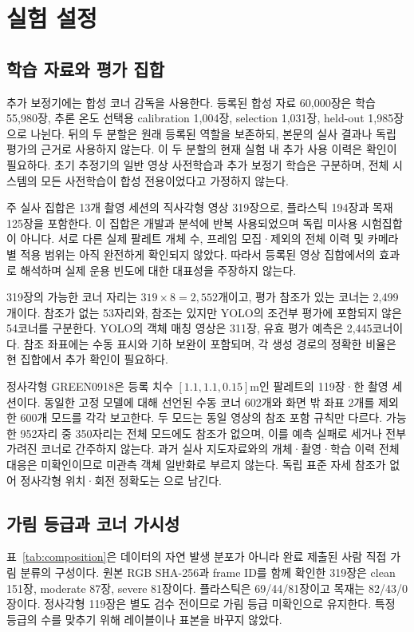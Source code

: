 \section{실험 설정}\label{sec:setup}
\subsection{학습 자료와 평가 집합}
추가 보정기에는 합성 코너 감독을 사용한다. 등록된 합성 자료 60,000장은 학습 55,980장, 추론 온도 선택용 calibration 1,004장, selection 1,031장, held-out 1,985장으로 나뉜다. 뒤의 두 분할은 원래 등록된 역할을 보존하되, 본문의 실사 결과나 독립 평가의 근거로 사용하지 않는다. 이 두 분할의 현재 실험 내 추가 사용 이력은 확인이 필요하다. 초기 추정기의 일반 영상 사전학습과 추가 보정기 학습은 구분하며, 전체 시스템의 모든 사전학습이 합성 전용이었다고 가정하지 않는다.

주 실사 집합은 13개 촬영 세션의 직사각형 영상 319장으로, 플라스틱 194장과 목재 125장을 포함한다. 이 집합은 개발과 분석에 반복 사용되었으며 독립 미사용 시험집합이 아니다. 서로 다른 실제 팔레트 개체 수, 프레임 모집·제외의 전체 이력 및 카메라별 적용 범위는 아직 완전하게 확인되지 않았다. 따라서 등록된 영상 집합에서의 효과로 해석하며 실제 운용 빈도에 대한 대표성을 주장하지 않는다.

319장의 가능한 코너 자리는 $319\times8=2,552$개이고, 평가 참조가 있는 코너는 2,499개이다. 참조가 없는 53자리와, 참조는 있지만 YOLO의 조건부 평가에 포함되지 않은 54코너를 구분한다. YOLO의 객체 매칭 영상은 311장, 유효 평가 예측은 2,445코너이다. 참조 좌표에는 수동 표시와 기하 보완이 포함되며, 각 생성 경로의 정확한 비율은 현 집합에서 추가 확인이 필요하다.

정사각형 GREEN0918은 등록 치수 $[1.1,1.1,0.15]$m인 팔레트의 119장·한 촬영 세션이다. 동일한 고정 모델에 대해 선언된 수동 코너 602개와 화면 밖 좌표 2개를 제외한 600개 모드를 각각 보고한다. 두 모드는 동일 영상의 참조 포함 규칙만 다르다. 가능한 952자리 중 350자리는 전체 모드에도 참조가 없으며, 이를 예측 실패로 세거나 전부 가려진 코너로 간주하지 않는다. 과거 실사 지도자료와의 개체·촬영·학습 이력 전체 대응은 미확인이므로 미관측 객체 일반화로 부르지 않는다. 독립 표준 자세 참조가 없어 정사각형 위치·회전 정확도는 \notrun 으로 남긴다.



\subsection{가림 등급과 코너 가시성}
표~\ref{tab:composition}은 데이터의 자연 발생 분포가 아니라 완료 제출된 사람 직접 가림 분류의 구성이다. 원본 RGB SHA-256과 frame ID를 함께 확인한 319장은 clean 151장, moderate 87장, severe 81장이다. 플라스틱은 69/44/81장이고 목재는 82/43/0장이다. 정사각형 119장은 별도 검수 전이므로 가림 등급 미확인으로 유지한다. 특정 등급의 수를 맞추기 위해 레이블이나 표본을 바꾸지 않았다.

